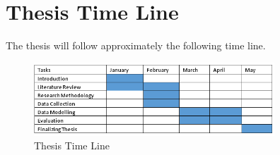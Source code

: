 \documentclass[12pt,a4paper,oneside,pdftex]{report}
\begin{document}
	\section{Thesis Time Line}
	\label{section:Time Line} 
	The thesis will follow approximately the following time line.
	
	\begin{figure}[ht]
		\begin{center}
			\includegraphics[width=9cm]{images/time.png}
			\caption{Thesis Time Line}
			\label{fig:Time Line}
		\end{center}
	\end{figure}
	
	\startchapright
	
	
\end{document}
